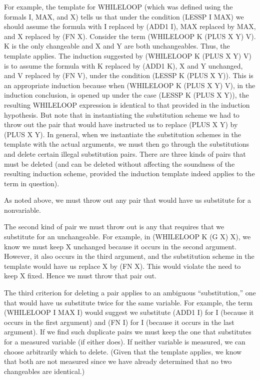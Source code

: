 \documentclass[11pt]{book}
\begin{document}
For example, the template for WHILELOOP (which was defined
using the formals I, MAX, and X) tells us that under the
condition (LESSP I MAX) we should assume the formula with I
replaced by (ADD1 I), MAX replaced by MAX, and X replaced by
(FN X).  Consider the term (WHILELOOP K (PLUS X Y) V).  K is
the only changeable and X and Y are both unchangeables.
Thus, the template applies.  The induction suggested by
(WHILELOOP K (PLUS X Y) V) is to assume the formula with K
replaced by (ADD1 K), X and Y unchanged, and V replaced by
(FN V), under the condition (LESSP K (PLUS X Y)).  This is
an appropriate induction because when (WHILELOOP K (PLUS X
Y) V), in the induction conclusion, is opened up under the
case (LESSP K (PLUS X Y)), the resulting WHILELOOP
expression is identical to that provided in the induction
hypothesis.  But note that in instantiating the substitution
scheme we had to throw out the pair that would have
instructed us to replace (PLUS X Y) by (PLUS X Y).  In
general, when we instantiate the substitution schemes in the
template with the actual arguments, we must then go through
the substitutions and delete certain illegal substitution
pairs.  There are three kinds of pairs that must be deleted
(and can be deleted without affecting the soundness of the
resulting induction scheme, provided the induction template
indeed applies to the term in question). 

As noted above, we must throw out any pair that would have us
substitute for a nonvariable.

The second kind of pair we must throw out is any that requires that
we substitute for an unchangeable.  For example, in (WHILELOOP K (G X) X),
we know we must keep X unchanged because it occurs in the second argument.
However, it also occurs in the third argument, and the substitution scheme
in the template would have us replace X by (FN X).  This would violate the
need to keep X fixed.  Hence we must throw that pair out.

The third criterion for deleting a pair applies to an ambiguous
``substitution,'' one that would have us substitute twice for the same
variable.  For example, the term (WHILELOOP I MAX I) would suggest we
substitute (ADD1 I) for I (because it occurs in the first argument) and
(FN I) for I (because it occurs in the last argument).  If we find such
duplicate pairs we must keep the one that substitutes for a measured
variable (if either does).  If neither variable is measured, we
can choose arbitrarily which to delete. (Given that the template applies, we know that both are not
measured since we have already determined that no two changeables are identical.)
\end{document}
